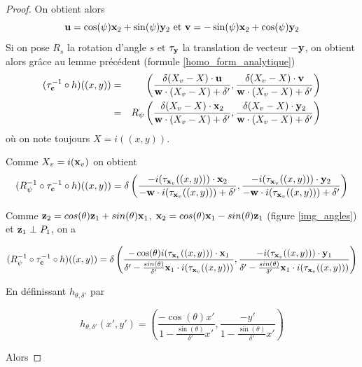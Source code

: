 \begin{proof}
On obtient alors
\begin{equation*}
\mathbf{u}=\cos(\psi)\mathbf{x}_{2}+\sin(\psi)\mathbf{y}_{2} \text{ et } \mathbf{v}=-\sin(\psi)\mathbf{x}_{2}+\cos(\psi)\mathbf{y}_{2}
\end{equation*}
Si on pose $R_{s}$ la rotation d'angle $s$ et $\tau_{\mathbf{y}}$ la translation de vecteur $-\mathbf{y}$, on obtient alors grâce au lemme précédent (formule \ref{homo_form_analytique})
\begin{eqnarray*}
(\tau_{\mathbf{c}}^{-1} \circ h)((x,y)) &=& \left(\frac{\delta (X_v-X)\cdot \mathbf{u} }{\mathbf{w} \cdot (X_v-X)+\delta'},\frac{\delta (X_v-X)\cdot \mathbf{v}}{\mathbf{w} \cdot (X_v-X)+\delta'}  \right) \\
                           &=& R_{\psi}\left(\frac{\delta (X_v-X)\cdot \mathbf{x}_{2} }{\mathbf{w} \cdot (X_v-X)+\delta'},\frac{\delta (X_v-X)\cdot \mathbf{y}_{2}}{\mathbf{w} \cdot (X_v-X)+\delta'}  \right) \\
\end{eqnarray*}
où on note toujours $X = i((x,y))$.

Comme $X_{v}=i(\mathbf{x}_v)$ on obtient
\begin{equation*}
(R_{\psi}^{-1} \circ \tau_{\mathbf{c}}^{-1}  \circ h)((x,y))=\delta \left(\frac{-i(\tau_{\mathbf{x}_v} ((x,y)))\cdot \mathbf{x}_{2} }{-\mathbf{w} \cdot i(\tau_{\mathbf{x}_v} ((x,y)))+\delta'},\frac{-i(\tau_{\mathbf{x}_v} ((x,y)))\cdot \mathbf{y}_{2}}{-\mathbf{w} \cdot i(\tau_{\mathbf{x}_v} ((x,y)))+\delta'}  \right) 
\end{equation*}

Comme $\mathbf{z}_{2}=cos(\theta)\mathbf{z}_{1}+sin(\theta)\mathbf{x}_{1}$, $\mathbf{x}_{2}=cos(\theta)\mathbf{x}_{1}-sin(\theta)\mathbf{z}_{1}$ (figure \ref{img_angles}) et $\mathbf{z}_{1}\perp P_{1}$, on a

\begin{equation*}
(R_{\psi}^{-1} \circ \tau_{\mathbf{c}}^{-1}  \circ h)((x,y))=\delta\left(\frac{-\cos(\theta)i(\tau_{\mathbf{x}_v} ((x,y)))\cdot \mathbf{x}_{1} }{\delta'-\frac{sin(\theta)}{\delta'}\mathbf{x}_{1}\cdot i(\tau_{\mathbf{x}_v}((x,y)))}, \frac{-i(\tau_{\mathbf{x}_v} ((x,y)))\cdot \mathbf{y}_{1}}{\delta'-\frac{sin(\theta)}{\delta'}\mathbf{x}_{1}\cdot i(\tau_{\mathbf{x}_v}((x,y)))}  \right) 
\end{equation*}

En définissant $h_{\theta,\delta'}$ par

\begin{equation*}
h_{\theta,\delta'}(x',y')=\left(\frac{-\cos(\theta)x'}{1-\frac{\sin(\theta)}{\delta'}x'} ,\frac{-y'}{1-\frac{\sin(\theta)}{\delta'}x'}\right)
\end{equation*}

Alors 


\end{proof}
